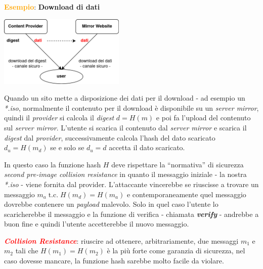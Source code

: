 \begin{boxA}
    \textcolor{orange}{\textbf{Esempio}}: \textbf{Download di dati}

    \medskip

    {\centering
        \includegraphics[width=0.45\textwidth]{img/hash_es.png}
    \par}

    Quando un sito mette a disposizione dei dati per il download - ad esempio un \textit{*.iso}, normalmente il contenuto per il download è disponibile su un \textit{server mirror}, quindi il \textit{provider} si calcola il \textit{digest} $d = H(m)$ e poi fa l'upload del contenuto sul \textit{server mirror}. L'utente si scarica il contenuto dal \textit{server mirror} e scarica il \textit{digest} dal \textit{provider}, successivamente calcola l'hash del dato scaricato $d_u = H(m_d)$ se e solo se $d_u = d$ accetta il dato scaricato.

    \smallskip

    In questo caso la funzione hash $H$ deve rispettare la ``normativa'' di sicurezza \textit{second pre-image collision resistance} in quanto il messaggio iniziale - la nostra \textit{*.iso} - viene fornita dal provider. L'attaccante vincerebbe se riuscisse a trovare un messaggio $m_a \; \text{t.c.} \; H(m_d) = H(m_a)$ e contemporaneamente quel messaggio dovrebbe contenere un \textit{payload} malevolo. Solo in quel caso l'utente lo scaricherebbe il messaggio e la funzione di verifica - chiamata \textbf{\textit{verify}} - andrebbe a buon fine e quindi l'utente accetterebbe il nuovo messaggio.
\end{boxA}

\begin{flushleft}
    \textcolor{red}{\textbf{\textit{Collision Resistance}}}: riuscire ad ottenere, arbitrariamente, due messaggi $m_1$ e $m_2$ tali che $H(m_1) = H(m_2)$ è la più forte come garanzia di sicurezza, nel caso dovesse mancare, la funzione hash sarebbe molto facile da violare.
\end{flushleft}